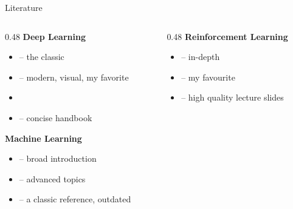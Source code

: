 \begin{frame}{Literature}
  \begin{columns}
    \begin{column}{0.48\textwidth}
      \textbf{Deep Learning}
      \begin{itemize}
        \item \cite{goodfellow2016deep} -- the classic
        \item \cite{prince2023understanding} -- modern, visual, my favorite
        \item \cite{bishop2024deep}
        \item \cite{fleuret2023little} -- concise handbook
      \end{itemize}

      \vspace{0.8em}
      \textbf{Machine Learning}
      \begin{itemize}
        \item \cite{murphy2022pml} -- broad introduction
        \item \cite{murphy2023pml2} -- advanced topics
        \item \cite{bishop2006pattern} -- a classic reference, outdated
      \end{itemize}
    \end{column}
    \begin{column}{0.48\textwidth}
      \textbf{Reinforcement Learning}
      \begin{itemize}
        \item \cite{sutton2018rl} -- in-depth
        \item \cite{silver2015rl} -- my favourite
        \item \cite{schneider2023rl} -- high quality lecture slides
      \end{itemize}
    \end{column}
  \end{columns}
\end{frame}

